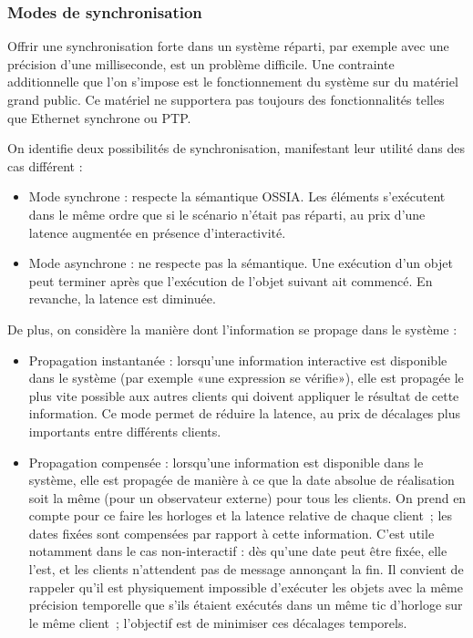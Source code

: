 \documentclass[10pt]{article}
\newcommand\ossia{OSSIA\xspace}
\begin{document}
\subsubsection{Modes de synchronisation}
Offrir une synchronisation forte dans un système réparti, par exemple avec une précision d'une milliseconde, est un problème difficile\cite{sheehy2015there}. 
Une contrainte additionnelle que l'on s'impose est le fonctionnement du système sur du matériel grand public. 
Ce matériel ne supportera pas toujours des fonctionnalités telles que Ethernet synchrone\cite{ferrant2008synchronous} ou PTP.


On identifie deux possibilités de synchronisation, manifestant leur utilité dans des cas différent : 
\begin{itemize}
	\item Mode synchrone : respecte la sémantique \ossia{}. Les éléments s'exécutent dans le même ordre que si le scénario n'était pas réparti, au prix d'une latence augmentée en présence d'interactivité.
	\item Mode asynchrone : ne respecte pas la sémantique. Une exécution d'un objet peut terminer après que l'exécution de l'objet suivant ait commencé. En revanche, la latence est diminuée.    
\end{itemize}

De plus, on considère la manière dont l'information se propage dans le système :

\begin{itemize}
	\item Propagation instantanée : lorsqu'une information interactive est disponible dans le système (par exemple «une expression se vérifie»), elle est propagée le plus vite possible aux autres clients qui doivent appliquer le résultat de cette information. 
    Ce mode permet de réduire la latence, au prix de décalages plus importants entre différents clients.
	\item Propagation compensée : lorsqu'une information est disponible dans le système, elle est propagée de manière à ce que la date absolue de réalisation soit la même (pour un observateur externe) pour tous les clients. 
	On prend en compte pour ce faire les horloges et la latence relative de chaque client~; les dates fixées sont compensées par rapport à cette information.
	C'est utile notamment dans le cas non-interactif : dès qu'une date peut être fixée, elle l'est, et les clients n'attendent pas de message annonçant la fin. 
	Il convient de rappeler qu'il est physiquement impossible d'exécuter les objets avec la même précision temporelle que s'ils étaient exécutés dans un même tic d'horloge sur le même client~; l'objectif est de minimiser ces décalages temporels.
\end{itemize}
\end{document}
